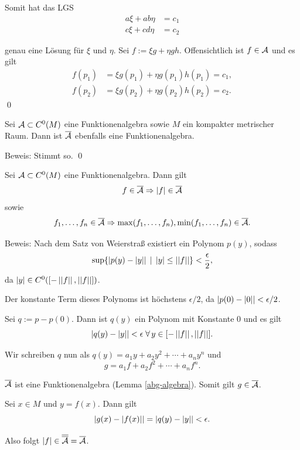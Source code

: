 \begin{frame}
    Somit hat das LGS 
    \begin{align*}
        a \xi + ab \eta &= c_1 \\
        c \xi + cd \eta &= c_2
    \end{align*}

    genau eine Lösung für \( \xi \) und \( \eta \). 
    \pause
    Sei \( f := \xi g + \eta g h \). \pause 
    Offensichtlich ist \( f \in \mathcal{A} \) \pause 
    und es gilt 
    \begin{align*}
        f(p_1) &= \xi g(p_1) + \eta g(p_1) h(p_1) = c_1, \\
        f(p_2) &= \xi g(p_2) + \eta g(p_2) h(p_2) = c_2.
    \end{align*}
    \qed
\end{frame}

\begin{frame}
    \begin{lem}\label{abg-algebra}
        Sei \( \mathcal{A} \subset C^0(M) \) eine Funktionenalgebra 
        sowie \(M\) ein kompakter metrischer Raum.
        Dann ist \( \overline{\mathcal{A}} \) ebenfalls eine Funktionenalgebra.
    \end{lem} \pause
    Beweis: \pause 
    Stimmt so. \qed
\end{frame}

\begin{frame}
    \begin{lem}\label{betrag-in-algebra}
        Sei \( \mathcal{A} \subset C^0(M) \) eine Funktionenalgebra. Dann gilt 
        \[ f \in \overline{\mathcal{A}} \Rightarrow \left|f\right| \in \overline{\mathcal{A}} \]
        sowie 
        \[ f_1, \ldots, f_n \in \overline{\mathcal{A}} \Rightarrow \max(f_1,\ldots, f_n), \min(f_1,\ldots, f_n) \in \overline{\mathcal{A}}. \]
    \end{lem} \pause
    Beweis:
    Nach dem Satz von Weierstraß existiert ein Polynom 
    \( p(y) \), sodass 
    \[ \sup \{ \left| p(y) - \left|y\right| \right| 
    \;|\; \left|y\right| \leq \left|\left|f\right|\right| \} < \frac{\epsilon}{2}, \]
    da \( \left|y\right| \in C^0([-\left|\left|f\right|\right|, \left|\left|f\right|\right|]) \). 
    \pause

    Der konstante Term dieses Polynoms ist höchstens \( \epsilon / 2 \), 
    da \( \left| p(0) - \left|0\right| \right| < \epsilon/2 \).
\end{frame}

\begin{frame}
    Sei \( q := p - p(0) \). Dann ist \( q(y) \) ein 
    Polynom mit Konstante \(0\) und es gilt 
    \[ \abs{ q(y) - \abs{y} } < \epsilon 
    \;\forall y \in [-\norm{f}, \norm{f}]. \]
    \pause

    Wir schreiben \( q \) nun als 
    \( q(y) = a_1 y + a_2 y^2 + \cdots + a_n y^n \) und 
    \[ g = a_1 f + a_2 f^2 + \cdots + a_n f^n. \]
    \pause

    \( \overline{\mathcal{A}} \) ist eine Funktionenalgebra (Lemma \ref{abg-algebra}).
    Somit gilt \( g \in \overline{\mathcal{A}} \). 
    \pause

    Sei \( x\in M \) und \( y = f(x) \). Dann gilt 
    \[ \left| g(x) - \left|f(x)\right| \right| = \left| q(y) - \left|y\right| \right| < \epsilon. \]
    \pause
    
    Also folgt \( \left|f\right| \in \overline{\overline{\mathcal{A}}} = \overline{\mathcal{A}} \). 
\end{frame}

